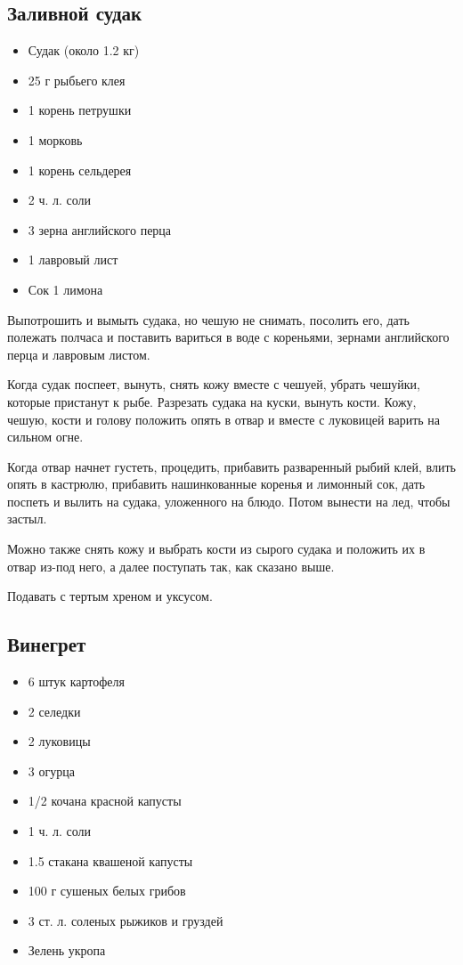 \subsection{Заливной судак}

\begin{itemize}
	\item Судак (около 1.2 кг)
    \item 25 г рыбьего клея
    \item 1 корень петрушки 
    \item 1 морковь 
    \item 1 корень сельдерея
    \item 2 ч. л. соли 
    \item 3 зерна английского перца
    \item 1 лавровый лист 
    \item Сок 1 лимона
\end{itemize}

Выпотрошить и вымыть судака, но чешую не снимать, посолить его, дать полежать полчаса и поставить вариться в воде с кореньями, зернами английского перца и лавровым листом.

Когда судак поспеет, вынуть, снять кожу вместе с чешуей, убрать чешуйки, которые пристанут к рыбе. Разрезать судака на куски, вынуть кости. Кожу, чешую, кости и голову положить опять в отвар и вместе с луковицей варить на сильном огне.

Когда отвар начнет густеть, процедить, прибавить разваренный рыбий клей, влить опять в кастрюлю, прибавить нашинкованные коренья и лимонный сок, дать поспеть и вылить на судака, уложенного на блюдо. Потом вынести на лед, чтобы застыл.

Можно также снять кожу и выбрать кости из сырого судака и положить их в отвар из-под него, а далее поступать так, как сказано выше.

Подавать с тертым хреном и уксусом.

\subsection{Винегрет}

\begin{itemize}
	\item 6 штук картофеля
    \item 2 селедки
    \item 2 луковицы
    \item 3 огурца 
    \item 1/2 кочана красной капусты 
    \item 1 ч. л. соли
    \item 1.5 стакана квашеной капусты
    \item 100 г сушеных белых грибов
    \item 3 ст. л. соленых рыжиков и груздей 
    \item Зелень укропа
\end{itemize}

